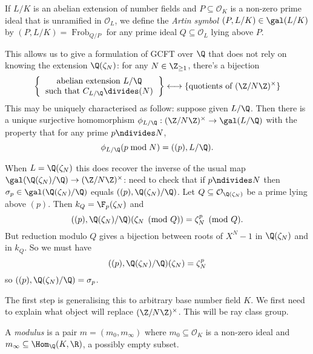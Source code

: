 \documentclass[a4paper]{article}
\renewcommand*{\O}{\mathcal{O}}
\DeclareMathOperator{\Frob}{Frob} %
\begin{document}
\begin{definition}
  If \(L/K\) is an abelian extension of number fields and \(P \subseteq \O_K\) is a non-zero prime ideal that is unramified in \(\O_L\), we define the \emph{Artin symbol} \((P, L/K) \in \gal(L/K)\) by \((P, L/K) = \Frob_{Q/P}\) for any prime ideal \(Q \subseteq \O_L\) lying above \(P\).
\end{definition}

This allows us to give a formulation of GCFT over \(\Q\) that does not rely on knowing the extension \(\Q(\zeta_N)\): for any \(N \in \Z_{\geq 1}\), there's a bijection
\[
  \left\{
    \begin{tabular}{c}
      abelian extension \(L/\Q\) \\
      such that \(C_{L/\Q} \divides (N)\)
    \end{tabular}
  \right\}
  \longleftrightarrow
  \{\text{quotients of } (\Z/N\Z)^\times\}
\]
This may be uniquely characterised as follow: suppose given \(L/\Q\). Then there is a unique surjective homomorphism \(\phi_{L/\Q}: (\Z/N\Z)^\times \to \gal(L/\Q)\) with the property that for any prime \(p \ndivides N\),
\[
  \phi_{L/\Q}(p \bmod N) = ((p), L/\Q).
\]

\begin{remark}
  When \(L = \Q(\zeta_N)\) this does recover the inverse of the usual map \(\gal(\Q(\zeta_N)/\Q) \to (\Z/N\Z)^\times\): need to check that if \(p \ndivides N\) then \(\sigma_p \in \gal(\Q(\zeta_N)/\Q)\) equals \(((p), \Q(\zeta_N)/\Q)\). Let \(Q \subseteq \O_{\Q(\zeta_N)}\) be a prime lying above \((p)\). Then \(k_Q = \F_p(\zeta_N)\) and
  \[
    ((p), \Q(\zeta_N)/\Q) (\zeta_N \pmod Q) = \zeta_N^p \pmod Q.
  \]
  But reduction modulo \(Q\) gives a bijection between roots of \(X^N - 1\) in \(\Q(\zeta_N)\) and in \(k_Q\). So we must have
  \[
    ((p), \Q(\zeta_N)/\Q)(\zeta_N) = \zeta_N^p
  \]
  so \(((p), \Q(\zeta_N)/\Q) = \sigma_p\).
\end{remark}

The first step is generalising this to arbitrary base number field \(K\). We first need to explain what object will replace \((\Z/N\Z)^\times\). This will be ray class group.

\begin{definition}[modulus]
  A \emph{modulus} is a pair \(m = (m_0, m_\infty)\) where \(m_0 \subseteq \O_K\) is a non-zero ideal and \(m_\infty \subseteq \Hom_\Q(K, \R)\), a possibly empty subset.
\end{definition}
\end{document}
